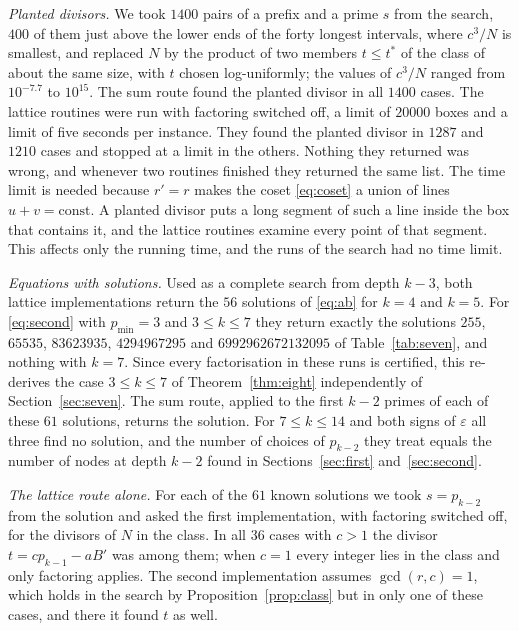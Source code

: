 \documentclass[11pt,reqno]{amsart}
\numberwithin{equation}{section}
\theoremstyle{plain}
\theoremstyle{definition}
\theoremstyle{remark}
\begin{document}
\emph{Planted divisors.} We took $1400$ pairs of a prefix and a prime
$s$ from the search, $400$ of them just above the lower ends of the
forty longest intervals, where $c^3/N$ is smallest, and replaced $N$ by
the product of two members $t\le t^*$ of the class of about the same
size, with $t$ chosen log-uniformly; the values of $c^3/N$ ranged from
$10^{-7.7}$ to $10^{15}$. The sum route found the planted divisor in
all $1400$ cases. The lattice routines were run with factoring switched
off, a limit of $20000$ boxes and a limit of five seconds per instance.
They found the planted divisor in $1287$ and $1210$ cases and stopped
at a limit in the others. Nothing they returned was wrong, and whenever
two routines finished they returned the same list. The time limit is
needed because $r'=r$ makes the coset \eqref{eq:coset} a union of
lines $u+v=\text{const}$. A planted divisor puts a long segment of
such a line inside the box that contains it, and the lattice routines
examine every point of that segment. This affects only the running
time, and the runs of the search had no time limit.

\emph{Equations with solutions.} Used as a complete search from depth
$k-3$, both lattice implementations return the $56$ solutions of
\eqref{eq:ab} for $k=4$ and $k=5$. For \eqref{eq:second} with
$p_{\min}=3$ and $3\le k\le7$ they return exactly the solutions
$255$, $65535$, $83623935$, $4294967295$ and $6992962672132095$ of
Table~\ref{tab:seven}, and nothing with $k=7$. Since every
factorisation in these runs is certified, this re-derives the case
$3\le k\le7$ of Theorem~\ref{thm:eight} independently of
Section~\ref{sec:seven}. The sum route, applied to the first $k-2$
primes of each of these $61$ solutions, returns the solution. For
$7\le k\le14$ and both signs of $\varepsilon$ all three find no
solution, and the number of choices of $p_{k-2}$ they treat equals the
number of nodes at depth $k-2$ found in Sections~\ref{sec:first}
and~\ref{sec:second}.

\emph{The lattice route alone.} For each of the $61$ known solutions
we took $s=p_{k-2}$ from the solution and asked the first
implementation, with factoring switched off, for the divisors of $N$ in
the class. In all $36$ cases with $c>1$ the divisor $t=cp_{k-1}-aB'$
was among them; when $c=1$ every integer lies in the class and only
factoring applies. The second implementation assumes $\gcd(r,c)=1$,
which holds in the search by Proposition~\ref{prop:class} but in only
one of these cases, and there it found $t$ as well.
\end{document}
